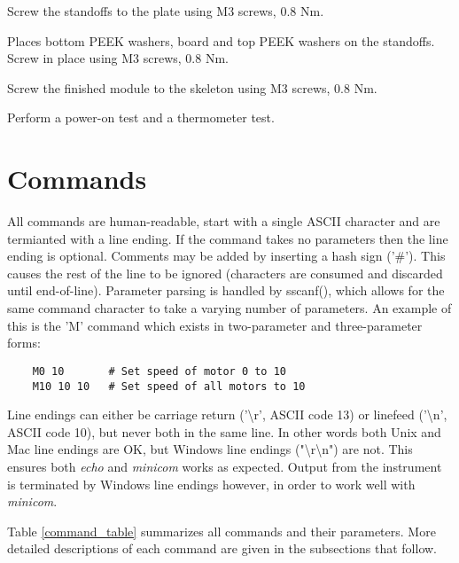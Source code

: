 \documentclass{article}
\begin{document}
Screw the standoffs to the plate using M3 screws, 0.8 Nm.

Places bottom PEEK washers, board and top PEEK washers on the standoffs.
Screw in place using M3 screws, 0.8 Nm.

Screw the finished module to the skeleton using M3 screws, 0.8 Nm.

Perform a power-on test and a thermometer test.

\section{Commands}

All commands are human-readable, start with a single ASCII character and are termianted with a line ending.
If the command takes no parameters then the line ending is optional.
Comments may be added by inserting a hash sign ('\#').
This causes the rest of the line to be ignored (characters are consumed and discarded until end-of-line).
Parameter parsing is handled by sscanf(), which allows for the same command character to take a varying number
of parameters. An example of this is the 'M' command which exists in two-parameter and three-parameter forms:

\begin{lstlisting}
    M0 10       # Set speed of motor 0 to 10
    M10 10 10   # Set speed of all motors to 10
\end{lstlisting}


Line endings can either be carriage return ('{\textbackslash}r', ASCII code 13) or linefeed ('{\textbackslash}n', ASCII code 10), but never both in the same line.
In other words both Unix and Mac line endings are OK, but Windows line endings ("{\textbackslash}r{\textbackslash}n") are not.
This ensures both {\it echo} and {\it minicom} works as expected.
Output from the instrument is terminated by Windows line endings however, in order to work well with {\it minicom}.

Table \vref{command_table} summarizes all commands and their parameters.
More detailed descriptions of each command are given in the subsections that follow.

\end{document}
